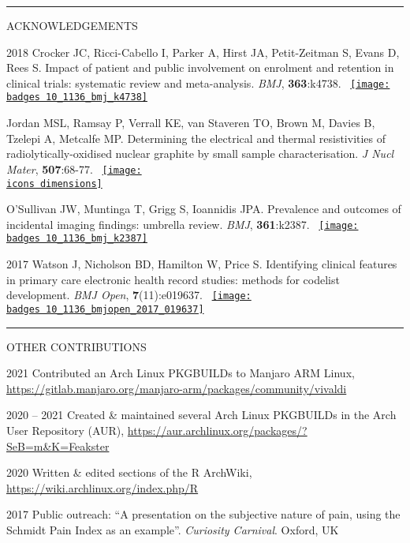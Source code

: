 \documentclass[10pt,a4paper]{article}
\def\badges{./badges/}
\def\icons{./icons/}
\begin{document}
\noindent\rule{\textwidth}{0.4pt}
\begin{cvlist}{ACKNOWLEDGEMENTS}
	
	\item[2018]
	Crocker JC, Ricci-Cabello I, Parker A, Hirst JA, Petit-Zeitman S, Evans D, Rees S. Impact of patient and public involvement on enrolment and retention in clinical trials: systematic review and meta-analysis. \textit{BMJ}, \textbf{363}:k4738. ~\href{https://bmj.altmetric.com/details/51859816}{\texttt{[image: \\badges 10\_1136\_bmj\_k4738]}}
	
	\item[]
	Jordan MSL, Ramsay P, Verrall KE, van Staveren TO, Brown M, Davies B, Tzelepi A, Metcalfe MP. Determining the electrical and thermal resistivities of radiolytically-oxidised nuclear graphite by small sample characterisation. \textit{J Nucl Mater}, \textbf{507}:68-77. ~\href{https://badge.dimensions.ai/details/id/pub.1103593195}{\texttt{[image: \\icons dimensions]}}
	
	\item[]
	O'Sullivan JW, Muntinga T, Grigg S, Ioannidis JPA. Prevalence and outcomes of incidental imaging findings: umbrella review. \textit{BMJ}, \textbf{361}:k2387. ~\href{https://bmj.altmetric.com/details/43831617}{\texttt{[image: \\badges 10\_1136\_bmj\_k2387]}}
	
	\item[2017]
	Watson J, Nicholson BD, Hamilton W, Price S. Identifying clinical features in primary care electronic health record studies: methods for codelist development. \textit{BMJ Open}, \textbf{7}(11):e019637. ~\href{https://bmj.altmetric.com/details/29319273}{\texttt{[image: \\badges 10\_1136\_bmjopen\_2017\_019637]}}
	
\end{cvlist}


\noindent\rule{\textwidth}{0.4pt}
\begin{cvlist}{OTHER CONTRIBUTIONS}
	
	\item[2021]
	Contributed an Arch Linux PKGBUILDs to Manjaro ARM Linux, \url{https://gitlab.manjaro.org/manjaro-arm/packages/community/vivaldi}
	
	\item[2020 -- 2021]
	Created \& maintained several Arch Linux PKGBUILDs in the Arch User Repository (AUR), \url{https://aur.archlinux.org/packages/?SeB=m&K=Feakster}
	
	\item[2020]
	Written \& edited sections of the R ArchWiki, \url{https://wiki.archlinux.org/index.php/R}
	
	\item[2017]
	Public outreach: ``A presentation on the subjective nature of pain, using the Schmidt Pain Index as an example''. \textit{Curiosity Carnival}. Oxford, UK
	
\end{cvlist}
\end{document}

